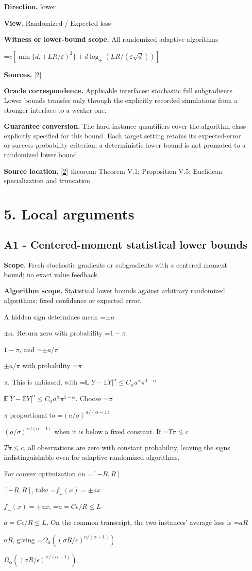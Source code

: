 \documentclass[10pt,a4paper]{article}
\newcommand{\AtlasMath}[1]{\par\begingroup\centering\setbox0=\hbox{$\displaystyle #1$}\ifdim\wd0>1.4\linewidth\typeout{ATLAS WIDE FORMULA: \the\wd0}\fi\ifdim\wd0>\linewidth\resizebox{\linewidth}{!}{\box0}\else\box0\fi\par\endgroup}
\newcommand{\AtlasInlineMath}[1]{\begingroup\setbox0=\hbox{$#1$}\ifdim\wd0>.4\linewidth\endgroup\AtlasMath{#1}\else\endgroup$#1$\fi}
\begin{document}
\textbf{Direction.} lower

\textbf{View.} Randomized / Expected loss

\textbf{Witness or lower-bound scope.} All randomized adaptive algorithms

\AtlasMath{c[\min\{d,(LR/\varepsilon)^2\}+d\log_+(LR/(\varepsilon\sqrt d))]}
\textbf{Sources.} \href{https://arxiv.org/pdf/1407.5144}{[2]}

\textbf{Oracle correspondence.} Applicable interfaces: stochastic full subgradients. Lower bounds transfer only through the explicitly recorded simulations from a stronger interface to a weaker one.

\textbf{Guarantee conversion.} The hard-instance quantifiers cover the algorithm class explicitly specified for this bound. Each target setting retains its expected-error or success-probability criterion; a deterministic lower bound is not promoted to a randomized lower bound.

\textbf{Source location.} \href{https://arxiv.org/pdf/1407.5144}{[2]} theorem: Theorem V.1; Proposition V.5; Euclidean specialization and truncation

\section{5. Local arguments}
\subsection{A1 - Centered-moment statistical lower bounds}
\textbf{Scope.} Fresh stochastic gradients or subgradients with a centered moment bound; no exact value feedback.

\textbf{Algorithm scope.} Statistical lower bounds against arbitrary randomized algorithms; fixed confidence or expected error.

A hidden sign determines mean \AtlasInlineMath{\pm a}. Return zero with probability \AtlasInlineMath{1-\pi}, and \AtlasInlineMath{\pm a/\pi} with probability \AtlasInlineMath{\pi}. This is unbiased, with
\AtlasInlineMath{\mathbb E|Y-\mathbb EY|^\alpha\le C_\alpha a^\alpha\pi^{1-\alpha}}.
Choose \AtlasInlineMath{\pi} proportional to \AtlasInlineMath{(a/\sigma)^{\alpha/(\alpha-1)}} when it is below a fixed constant. If \AtlasInlineMath{T\pi\le c}, all observations are zero with constant probability, leaving the signs indistinguishable even for adaptive randomized algorithms.

For convex optimization on \AtlasInlineMath{[-R,R]}, take \AtlasInlineMath{f_\pm(x)=\pm ax}, \AtlasInlineMath{a=C\epsilon/R\le L}. On the common transcript, the two instances' average loss is \AtlasInlineMath{aR}, giving
\AtlasInlineMath{\Omega_\alpha((\sigma R/\epsilon)^{\alpha/(\alpha-1)})}.
\end{document}
